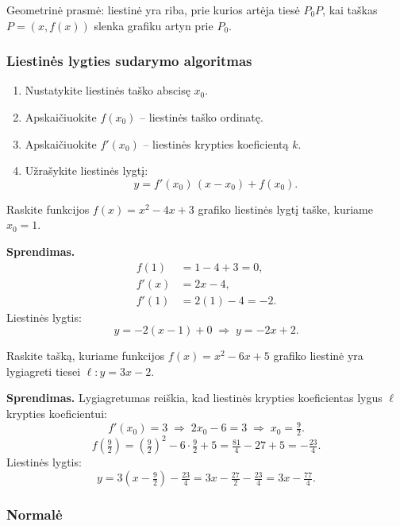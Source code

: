 \begin{remark}
Geometrinė prasmė: liestinė yra riba, prie kurios artėja tiesė $P_0 P$,
kai taškas $P=(x,f(x))$ slenka grafiku artyn prie $P_0$.
\end{remark}

\subsubsection*{Liestinės lygties sudarymo algoritmas}

\begin{enumerate}
  \item Nustatykite liestinės taško abscisę $x_0$.
  \item Apskaičiuokite $f(x_0)$ -- liestinės taško ordinatę.
  \item Apskaičiuokite $f'(x_0)$ -- liestinės krypties koeficientą $k$.
  \item Užrašykite liestinės lygtį:
        \[
          y = f'(x_0)\,(x - x_0) + f(x_0).
        \]
\end{enumerate}

\begin{example}
Raskite funkcijos $f(x) = x^2 - 4x + 3$ grafiko liestinės lygtį taške,
kuriame $x_0 = 1$.

\textbf{Sprendimas.}
\begin{align*}
  f(1)  &= 1 - 4 + 3 = 0, \\
  f'(x) &= 2x - 4, \\
  f'(1) &= 2(1)-4 = -2.
\end{align*}
Liestinės lygtis:
\[
  y = -2(x-1) + 0 \;\Longrightarrow\; \boxed{y = -2x + 2}.
\]
\end{example}

\begin{example}
Raskite tašką, kuriame funkcijos $f(x) = x^2 - 6x + 5$ grafiko liestinė
yra lygiagreti tiesei $\ell\colon y = 3x - 2$.

\textbf{Sprendimas.}
Lygiagretumas reiškia, kad liestinės krypties koeficientas lygus $\ell$
krypties koeficientui:
\[
  f'(x_0) = 3 \;\Longrightarrow\; 2x_0 - 6 = 3 \;\Longrightarrow\;
  x_0 = \tfrac{9}{2}.
\]
\[
  f\!\left(\tfrac{9}{2}\right)
    = \left(\tfrac{9}{2}\right)^2 - 6\cdot\tfrac{9}{2} + 5
    = \tfrac{81}{4} - 27 + 5 = -\tfrac{23}{4}.
\]
Liestinės lygtis:
\[
  y = 3\!\left(x - \tfrac{9}{2}\right) - \tfrac{23}{4}
    = 3x - \tfrac{27}{2} - \tfrac{23}{4}
    = 3x - \tfrac{77}{4}.
\]
\end{example}

\subsubsection*{Normalė}

